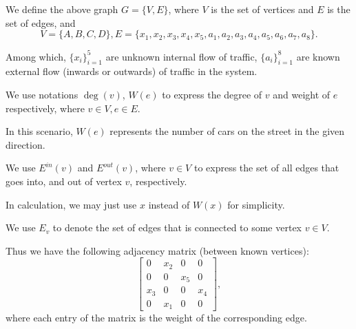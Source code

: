 \documentclass[12pt,a4paper]{article}
\begin{document}
We define the above graph $G = \{V,E\}$, where $V$ is the set of vertices and $E$ is the set of edges, and 
$$V=\{A,B,C,D\}, E=\{x_1,x_2,x_3,x_4,x_5,a_1,a_2,a_3,a_4,a_5,a_6,a_7,a_8\}.$$

Among which, $\{x_i\}_{i=1}^5$ are unknown internal flow of traffic, $\{a_i\}_{i=1}^8$ are known external flow (inwards or outwards) of traffic in the system.

\begin{notation}
We use notations $\deg(v)$, $W(e)$ to express the degree of $v$ and weight of $e$ respectively, where $v \in V,e\in E$.
\begin{remark}
    In this scenario, $W(e)$ represents the number of cars on the street in the given direction.
\end{remark}
\end{notation}

\begin{notation}
We use $E^{in}(v)$ and $E^{out}(v)$, where $v \in V$ to express the set of all edges that goes into, and out of vertex $v$, respectively. 
\begin{remark}
    In calculation, we may just use $x$ instead of $W(x)$ for simplicity.
\end{remark}
\end{notation}

\begin{notation}
We use $E_v$ to denote the set of edges that is connected to some vertex $v \in V$.
\end{notation}

Thus we have the following adjacency matrix (between known vertices):
\begin{equation}
\begin{bmatrix}
0 & x_2 & 0 & 0 \\
0 & 0 & x_5 & 0 \\
x_3 & 0 & 0 & x_4 \\
0 & x_1 & 0 & 0
\end{bmatrix},
\end{equation}
where each entry of the matrix is the weight of the corresponding edge.
\end{document}
